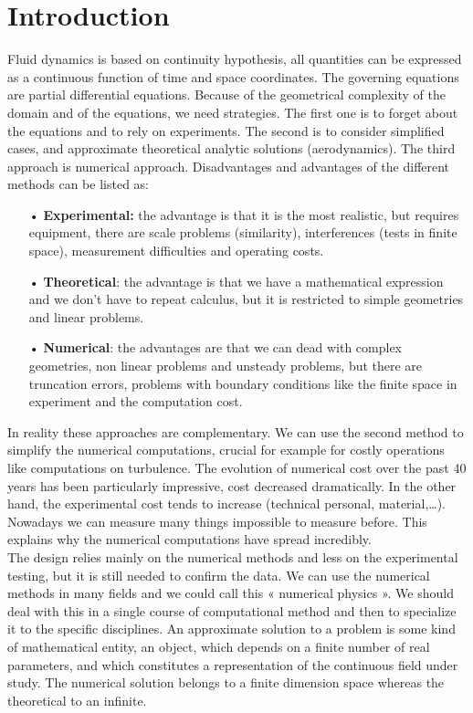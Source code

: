
\chapter*{Introduction}

Fluid dynamics is based on continuity hypothesis, all quantities can be expressed as a continuous function of time and space coordinates. The governing equations are partial differential equations. Because of the geometrical complexity of the domain and of the equations, we need strategies. The first one is to forget about the equations and to rely on experiments. The second is to consider simplified cases, and approximate theoretical analytic solutions (aerodynamics). The third approach is numerical approach. Disadvantages and advantages of the different methods can be listed as: \\

\begin{itemize}
\item[•] \textbf{Experimental:} the advantage is that it is the most realistic, but requires equipment, there are scale problems (similarity), interferences (tests in finite space), measurement difficulties and operating costs.
\item[•] \textbf{Theoretical}: the advantage is that we have a mathematical expression and we don't have to repeat calculus, but it is restricted to simple geometries and linear problems. 
\item[•] \textbf{Numerical}: the advantages are that we can dead with complex geometries, non linear problems and unsteady problems, but there are truncation errors, problems with boundary conditions like the finite space in experiment and the computation cost. \\
\end{itemize}

In reality these approaches are complementary. We can use the second method to simplify the numerical computations, crucial for example for costly operations like computations on turbulence. The evolution of numerical cost over the past 40 years has been particularly impressive, cost decreased dramatically. In the other hand, the experimental cost tends to increase (technical personal, material,…). Nowadays we can measure many things impossible to measure before. This explains why the numerical computations have spread incredibly. \\

The design relies mainly on the numerical methods and less on the experimental testing, but it is still needed to confirm the data. We can use the numerical methods in many fields and we could call this « numerical physics ». We should deal with this in a single course of computational method and then to specialize it to the specific disciplines. An approximate solution to a problem is some kind of mathematical entity, an object, which depends on a finite number of real parameters, and which constitutes a representation of the continuous field under study. The numerical solution belongs to a finite dimension space whereas the theoretical to an infinite. \\

